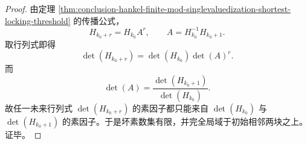 \begin{proof}
由定理 \ref{thm:conclusion-hankel-finite-mod-singlevaluedization-shortest-locking-threshold} 的传播公式，
\[
H_{k_0+r}=H_{k_0}A^r,
\qquad
A=H_{k_0}^{-1}H_{k_0+1}.
\]
取行列式即得
\[
\det(H_{k_0+r})=\det(H_{k_0})\det(A)^r.
\]
而
\[
\det(A)=\frac{\det(H_{k_0+1})}{\det(H_{k_0})}.
\]
故任一未来行列式 \(\det(H_{k_0+r})\) 的素因子都只能来自 \(\det(H_{k_0})\) 与 \(\det(H_{k_0+1})\) 的素因子。于是坏素数集有限，并完全局域于初始相邻两块之上。证毕。
\end{proof}
